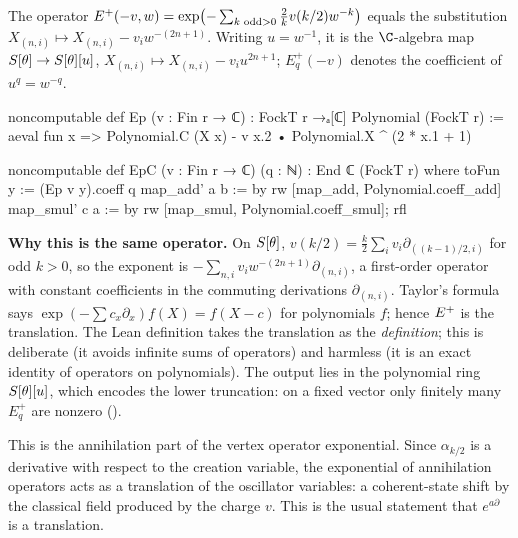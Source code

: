 \begin{definition}\label{ch08:def:Ep}
The operator $E^{+}(-v,w)=\exp\bigl(-\sum_{k\text{ odd}>0}\frac2kv(k/2)w^{-k}\bigr)$ equals the
substitution $X_{(n,i)}\mapsto X_{(n,i)}-v_iw^{-(2n+1)}$.  Writing $u=w^{-1}$, it is the
$\C$-algebra map $S[\theta]\to S[\theta][u]$, $X_{(n,i)}\mapsto X_{(n,i)}-v_iu^{2n+1}$;
$E^+_q(-v)$ denotes the coefficient of $u^q=w^{-q}$.
\end{definition}
\begin{leancode}
noncomputable def Ep (v : Fin r → ℂ) : FockT r →ₐ[ℂ] Polynomial (FockT r) :=
  aeval fun x => Polynomial.C (X x) - v x.2 • Polynomial.X ^ (2 * x.1 + 1)

noncomputable def EpC (v : Fin r → ℂ) (q : ℕ) : End ℂ (FockT r) where
  toFun y := (Ep v y).coeff q
  map_add' a b := by rw [map_add, Polynomial.coeff_add]
  map_smul' c a := by rw [map_smul, Polynomial.coeff_smul]; rfl
\end{leancode}
\begin{dictionary}
\textbf{Why this is the same operator.}  On $S[\theta]$, $v(k/2)=\frac k2\sum_iv_i\partial_{((k-1)/2,i)}$
for odd $k>0$, so the exponent is $-\sum_{n,i}v_iw^{-(2n+1)}\partial_{(n,i)}$, a first-order
operator with constant coefficients in the commuting derivations $\partial_{(n,i)}$.  Taylor's
formula says $\exp(-\sum c_x\partial_x)f(X)=f(X-c)$ for polynomials $f$; hence $E^{+}$ is
the translation.  The Lean definition takes the translation as the \emph{definition}; this is
deliberate (it avoids infinite sums of operators) and harmless (it is an exact identity of
operators on polynomials).  The output lies in the polynomial ring $S[\theta][u]$, which encodes
the lower truncation: on a fixed vector only finitely many $E^+_q$ are nonzero
().
\end{dictionary}

\begin{physics}
This is the annihilation part of the vertex operator exponential. Since $\alpha_{k/2}$ is a derivative with respect to the creation variable, the exponential of annihilation operators acts as a translation of the oscillator variables: a coherent-state shift by the classical field produced by the charge $v$. This is the usual statement that $e^{a\partial}$ is a translation.
\end{physics}

